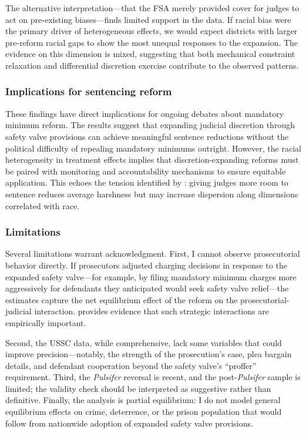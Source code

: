 \documentclass[12pt]{article}
\begin{document}
The alternative interpretation---that the FSA merely provided cover for judges to act on pre-existing biases---finds limited support in the data. If racial bias were the primary driver of heterogeneous effects, we would expect districts with larger pre-reform racial gaps to show the most unequal responses to the expansion. The evidence on this dimension is mixed, suggesting that both mechanical constraint relaxation and differential discretion exercise contribute to the observed patterns.

\subsubsection*{Implications for sentencing reform}
These findings have direct implications for ongoing debates about mandatory minimum reform. The results suggest that expanding judicial discretion through safety valve provisions can achieve meaningful sentence reductions without the political difficulty of repealing mandatory minimums outright. However, the racial heterogeneity in treatment effects implies that discretion-expanding reforms must be paired with monitoring and accountability mechanisms to ensure equitable application. This echoes the tension identified by \citet{cohen2019judicial}: giving judges more room to sentence reduces average harshness but may increase dispersion along dimensions correlated with race.

\subsubsection*{Limitations}
Several limitations warrant acknowledgment. First, I cannot observe prosecutorial behavior directly. If prosecutors adjusted charging decisions in response to the expanded safety valve---for example, by filing mandatory minimum charges more aggressively for defendants they anticipated would seek safety valve relief---the estimates capture the net equilibrium effect of the reform on the prosecutorial-judicial interaction. \citet{tuttle2019snitch} provides evidence that such strategic interactions are empirically important.

Second, the USSC data, while comprehensive, lack some variables that could improve precision---notably, the strength of the prosecution's case, plea bargain details, and defendant cooperation beyond the safety valve's ``proffer'' requirement. Third, the \textit{Pulsifer} reversal is recent, and the post-\textit{Pulsifer} sample is limited; the validity check should be interpreted as suggestive rather than definitive. Finally, the analysis is partial equilibrium: I do not model general equilibrium effects on crime, deterrence, or the prison population that would follow from nationwide adoption of expanded safety valve provisions.
\end{document}
